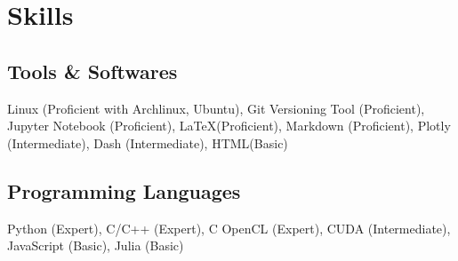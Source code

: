 \documentclass[]{resume}
\begin{document}
\begin{minipage}[t]{0.5\textwidth}
    \section{Skills}

    \subsection{Tools \& Softwares}
    Linux (Proficient with Archlinux, Ubuntu),
    Git Versioning Tool (Proficient),
    Jupyter Notebook (Proficient),
    \LaTeX (Proficient),
    Markdown (Proficient),
    Plotly (Intermediate),
    Dash (Intermediate),
    HTML(Basic)\\

    \subsection{Programming Languages}
    Python (Expert), C/C++ (Expert), C OpenCL (Expert), CUDA (Intermediate), JavaScript (Basic), Julia (Basic)


\end{minipage}
\hfill
\end{document}
